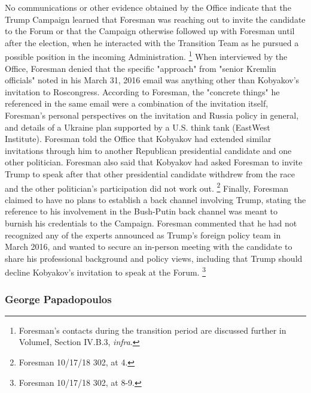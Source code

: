 No communications or other evidence obtained by the Office indicate that the Trump Campaign learned that Foresman was reaching out to invite the candidate to the Forum or that the Campaign otherwise followed up with Foresman until after the election, when he interacted with the Transition Team as he pursued a possible position in the incoming Administration.%
\footnote{Foresman’s contacts during the transition period are discussed further in VolumeI, Section IV.B.3, \textit{infra}.}
When interviewed by the Office, Foresman denied that the specific "approach" from "senior Kremlin officials" noted in his March 31, 2016 email was anything other than Kobyakov's invitation to Roscongress.
According to Foresman, the "concrete things" he referenced in the same email were a combination of the invitation itself, Foresman's personal perspectives on the invitation and Russia policy in general, and details of a Ukraine plan supported by a U.S. think tank (EastWest Institute).
Foresman told the Office that Kobyakov had extended similar invitations through him to another Republican presidential candidate and one other politician.
Foresman also said that Kobyakov had asked Foresman to invite Trump to speak after that other presidential candidate withdrew from the race and the other politician's participation did not work out.%
\footnote{Foresman 10/17/18 302, at 4.}
Finally, Foresman claimed to have no plans to establish a back channel involving Trump, stating the reference to his involvement in the Bush-Putin back channel was meant to burnish his credentials to the Campaign.
Foresman commented that he had not recognized any of the experts announced as Trump's foreign policy team in March 2016, and wanted to secure an in-person meeting with the candidate to share his professional background and policy views, including that Trump should decline Kobyakov's invitation to speak at the Forum.%
\footnote{Foresman 10/17/18 302, at 8-9.}

\subsubsection{George Papadopoulos}


